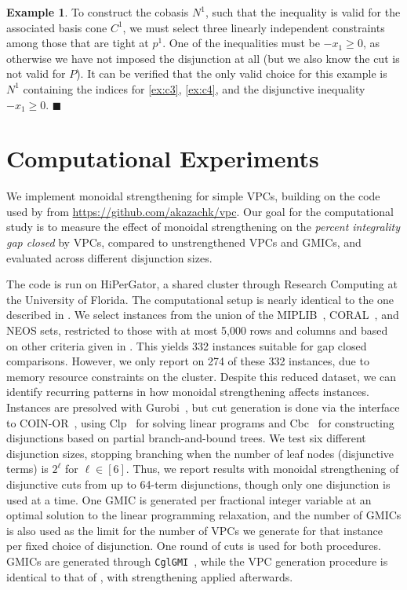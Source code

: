\documentclass[oribibl,envcountsame]{llncs}
\theoremstyle{remark}
\theoremstyle{definition}
\newtheorem{example}{Example}
\def\ifmonospace{\ifdim\fontdimen3\font=0pt }
\def\Cpp{%
\ifmonospace%
    C++%
\else%
    C\nolinebreak[4]\raisebox{0.5ex}{\tiny\textbf{++}}%
\fi%
\spacefactor1000 }
\newcommand{\exqed}{\hfill$\blacksquare$}
\begin{document}
\begin{example}
To construct the cobasis $N^1$, such that the inequality is valid for the associated basis cone $C^1$,
we must select three linearly independent constraints among those that are tight at $p^1$.
One of the inequalities must be $-x_1 \ge 0$, as otherwise we have not imposed the disjunction at all (but we also know the cut is not valid for $P$).
It can be verified that the only valid choice for this example is $N^1$ containing the indices for \cref{ex:c3}, \cref{ex:c4}, and the disjunctive inequality $-x_1 \ge 0$.
\exqed
\end{example}


\section{Computational Experiments}
\label{sec:computation}

We implement monoidal strengthening for simple VPCs, building on the code used by \citet{BalKaz22+_vpc-arxiv} from \url{https://github.com/akazachk/vpc}.
Our goal for the computational study is to measure the effect of monoidal strengthening on the \emph{percent integrality gap closed} by VPCs, compared to unstrengthened VPCs and GMICs,
and evaluated across different disjunction sizes.

The code is run on HiPerGator, a shared cluster through Research Computing at the University of Florida.
The computational setup is nearly identical to the one described in \citet[Section~5 and Appendix~C]{BalKaz22+_vpc-arxiv}.
We select instances from the union of the MIPLIB~\cite{MIPLIB,MIPLIB3,MIPLIB2003,MIPLIB2010,MIPLIB2017}, CORAL~\cite{CORAL}, and NEOS
sets, restricted to those with at most 5,000 rows and columns and based on other criteria given in 
\cite[Appendix~C]{BalKaz22+_vpc-arxiv}.
This yields 332 instances suitable for gap closed comparisons.
However, we only report on 274 of these 332 instances, due to memory resource constraints on the cluster.
Despite this reduced dataset, we can identify recurring patterns in how monoidal strengthening affects instances.
Instances are presolved with Gurobi~\cite{Gurobi}, but cut generation is done via the \Cpp{} interface to COIN-OR~\cite{COIN-OR}, 
using Clp~\cite{Clp} for solving linear programs and Cbc~\cite{Cbc} for constructing disjunctions based on partial branch-and-bound trees.
We test six different disjunction sizes, stopping branching when the number of leaf nodes (disjunctive terms) is $2^\ell$ for $\ell \in [6]$.
Thus, we report results with monoidal strengthening of disjunctive cuts from up to 64-term disjunctions,
though only one disjunction is used at a time.
One GMIC is generated per fractional integer variable at an optimal solution to the linear programming relaxation,
and the number of GMICs is also used as the limit for the number of VPCs we generate for that instance per fixed choice of disjunction.
One round of cuts is used for both procedures.
GMICs are generated through \texttt{CglGMI}~\cite{Cgl},
while the VPC generation procedure is identical to that of \citet{BalKaz22+_vpc-arxiv},
with strengthening applied afterwards.
\end{document}
